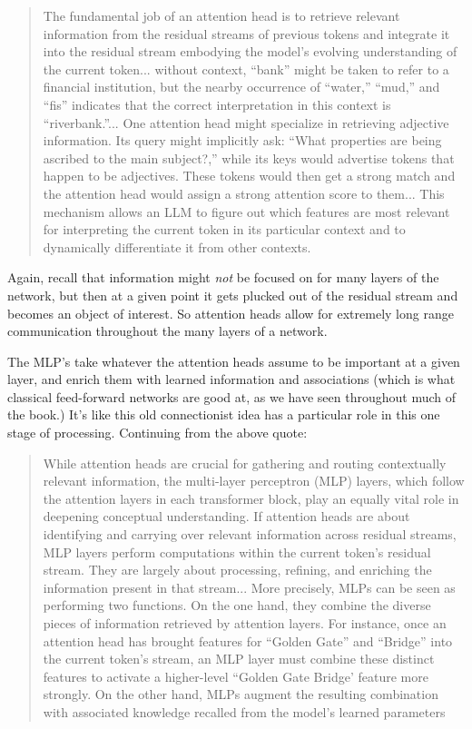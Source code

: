 \begin{quote}
The fundamental job of an attention head is to retrieve relevant information from the residual streams of previous tokens and integrate it into the residual stream embodying the model’s evolving understanding of the current token... without context, ``bank'' might be taken to refer to a financial institution, but the nearby occurrence of ``water,'' ``mud,'' and ``fis'' indicates that the correct interpretation in this context is ``riverbank.''... One attention head might specialize in retrieving adjective information. Its query might implicitly ask: ``What properties are being ascribed to the main subject?,'' while its keys would advertise tokens that happen to be adjectives. These tokens would then get a strong match and the attention head would assign a strong attention score to them... This mechanism allows an LLM to figure out which features are most relevant for interpreting the current token in its particular context and to dynamically differentiate it from other contexts.
\end{quote}
Again, recall that information might \emph{not} be focused on for many layers of the network, but then at a given point it gets plucked out of the residual stream and becomes an object of interest. So attention heads allow for extremely long range communication throughout the many layers of a network.

The MLP's take whatever the attention heads assume to be important at a given layer, and enrich them with learned information and associations (which is what classical feed-forward networks are good at, as we have seen throughout much of the book.) It's like this old connectionist idea has a particular role in this one stage of processing. Continuing from the above quote:
\begin{quote}
While attention heads are crucial for gathering and routing contextually relevant information, the multi-layer perceptron (MLP) layers, which follow the attention layers in each transformer block, play an equally vital role in deepening conceptual understanding. If attention heads are about identifying and carrying over relevant information across residual streams, MLP layers perform computations within the current token’s residual stream. They are largely about processing, refining, and enriching the information present in that stream... More precisely, MLPs can be seen as performing two functions. On the one hand, they combine the diverse pieces of information retrieved by attention layers. For instance, once an attention head has brought features for ``Golden Gate'' and ``Bridge'' into the current token’s stream, an MLP layer must combine these distinct features to activate a higher-level ``Golden Gate Bridge' feature more strongly. On the other hand, MLPs augment the resulting combination with associated knowledge recalled from the model’s learned parameters
\end{quote}

